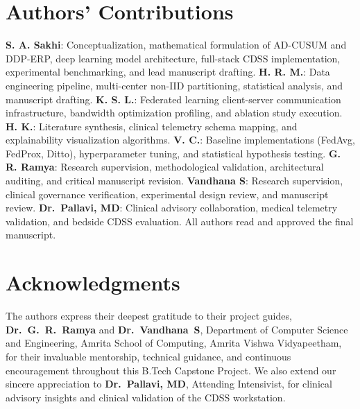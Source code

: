 \documentclass[10pt,a4paper,twocolumn,twoside]{article}
\begin{document}
\section*{Authors' Contributions}
\textbf{S. A. Sakhi}: Conceptualization, mathematical formulation of AD-CUSUM and DDP-ERP, deep learning model architecture, full-stack CDSS implementation, experimental benchmarking, and lead manuscript drafting. 
\textbf{H. R. M.}: Data engineering pipeline, multi-center non-IID partitioning, statistical analysis, and manuscript drafting. 
\textbf{K. S. L.}: Federated learning client-server communication infrastructure, bandwidth optimization profiling, and ablation study execution. 
\textbf{H. K.}: Literature synthesis, clinical telemetry schema mapping, and explainability visualization algorithms. 
\textbf{V. C.}: Baseline implementations (FedAvg, FedProx, Ditto), hyperparameter tuning, and statistical hypothesis testing. 
\textbf{G. R. Ramya}: Research supervision, methodological validation, architectural auditing, and critical manuscript revision. 
\textbf{Vandhana S}: Research supervision, clinical governance verification, experimental design review, and manuscript review. 
\textbf{Dr.~Pallavi, MD}: Clinical advisory collaboration, medical telemetry validation, and bedside CDSS evaluation.
All authors read and approved the final manuscript.

\section*{Acknowledgments}
The authors express their deepest gratitude to their project guides, \textbf{Dr.~G.~R.~Ramya} and \textbf{Dr.~Vandhana~S}, Department of Computer Science and Engineering, Amrita School of Computing, Amrita Vishwa Vidyapeetham, for their invaluable mentorship, technical guidance, and continuous encouragement throughout this B.Tech Capstone Project. We also extend our sincere appreciation to \textbf{Dr.~Pallavi, MD}, Attending Intensivist, for clinical advisory insights and clinical validation of the CDSS workstation.



\end{document}
